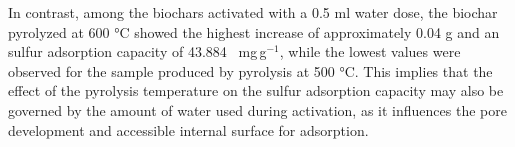 \newpage
In contrast, among the biochars activated with a 0.5 ml water dose, the biochar pyrolyzed at 600 °C showed the highest increase of approximately 0.04 g and an sulfur adsorption capacity of 43.884 ~mg\,g$^{-1}$, while the lowest values were observed for the sample produced by pyrolysis at 500 °C. This implies that the effect of the pyrolysis temperature on the sulfur adsorption capacity may also be governed by the amount of water used during activation, as it influences the pore development and accessible internal surface for adsorption. 



\vspace{0.3em}

